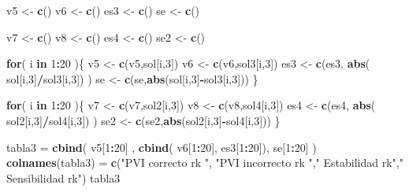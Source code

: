 \documentclass[]{article}
\newenvironment{Shaded}{\begin{snugshade}}{\end{snugshade}}
\newcommand{\KeywordTok}[1]{\textcolor[rgb]{0.13,0.29,0.53}{\textbf{#1}}}
\newcommand{\DecValTok}[1]{\textcolor[rgb]{0.00,0.00,0.81}{#1}}
\newcommand{\StringTok}[1]{\textcolor[rgb]{0.31,0.60,0.02}{#1}}
\newcommand{\ControlFlowTok}[1]{\textcolor[rgb]{0.13,0.29,0.53}{\textbf{#1}}}
\newcommand{\OperatorTok}[1]{\textcolor[rgb]{0.81,0.36,0.00}{\textbf{#1}}}
\newcommand{\NormalTok}[1]{#1}
\begin{document}
\begin{Shaded}
\begin{Highlighting}[]
\NormalTok{v5 <-}\StringTok{ }\KeywordTok{c}\NormalTok{()}
\NormalTok{v6 <-}\StringTok{ }\KeywordTok{c}\NormalTok{()}
\NormalTok{es3 <-}\StringTok{ }\KeywordTok{c}\NormalTok{()}
\NormalTok{se <-}\StringTok{ }\KeywordTok{c}\NormalTok{()}

\NormalTok{v7 <-}\StringTok{ }\KeywordTok{c}\NormalTok{()}
\NormalTok{v8 <-}\StringTok{ }\KeywordTok{c}\NormalTok{()}
\NormalTok{es4 <-}\StringTok{ }\KeywordTok{c}\NormalTok{()}
\NormalTok{se2 <-}\StringTok{ }\KeywordTok{c}\NormalTok{()}

\ControlFlowTok{for}\NormalTok{( i }\ControlFlowTok{in} \DecValTok{1}\OperatorTok{:}\DecValTok{20}\NormalTok{ )\{}
\NormalTok{  v5 <-}\StringTok{ }\KeywordTok{c}\NormalTok{(v5,sol[i,}\DecValTok{3}\NormalTok{])}
\NormalTok{  v6 <-}\StringTok{ }\KeywordTok{c}\NormalTok{(v6,sol3[i,}\DecValTok{3}\NormalTok{])}
\NormalTok{  es3 <-}\StringTok{ }\KeywordTok{c}\NormalTok{(es3, }\KeywordTok{abs}\NormalTok{( sol[i,}\DecValTok{3}\NormalTok{]}\OperatorTok{/}\NormalTok{sol3[i,}\DecValTok{3}\NormalTok{]) ) }
\NormalTok{  se <-}\StringTok{ }\KeywordTok{c}\NormalTok{(se,}\KeywordTok{abs}\NormalTok{(sol[i,}\DecValTok{3}\NormalTok{]}\OperatorTok{-}\NormalTok{sol3[i,}\DecValTok{3}\NormalTok{]))}
\NormalTok{\}}

\ControlFlowTok{for}\NormalTok{( i }\ControlFlowTok{in} \DecValTok{1}\OperatorTok{:}\DecValTok{20}\NormalTok{ )\{}
\NormalTok{  v7 <-}\StringTok{ }\KeywordTok{c}\NormalTok{(v7,sol2[i,}\DecValTok{3}\NormalTok{])}
\NormalTok{  v8 <-}\StringTok{ }\KeywordTok{c}\NormalTok{(v8,sol4[i,}\DecValTok{3}\NormalTok{])}
\NormalTok{  es4 <-}\StringTok{ }\KeywordTok{c}\NormalTok{(es4, }\KeywordTok{abs}\NormalTok{( sol2[i,}\DecValTok{3}\NormalTok{]}\OperatorTok{/}\NormalTok{sol4[i,}\DecValTok{3}\NormalTok{]) ) }
\NormalTok{  se2 <-}\StringTok{ }\KeywordTok{c}\NormalTok{(se2,}\KeywordTok{abs}\NormalTok{(sol2[i,}\DecValTok{3}\NormalTok{]}\OperatorTok{-}\NormalTok{sol4[i,}\DecValTok{3}\NormalTok{]))}
\NormalTok{\}}

\NormalTok{tabla3 =}\StringTok{ }\KeywordTok{cbind}\NormalTok{( v5[}\DecValTok{1}\OperatorTok{:}\DecValTok{20}\NormalTok{] , }\KeywordTok{cbind}\NormalTok{( v6[}\DecValTok{1}\OperatorTok{:}\DecValTok{20}\NormalTok{], es3[}\DecValTok{1}\OperatorTok{:}\DecValTok{20}\NormalTok{]), se[}\DecValTok{1}\OperatorTok{:}\DecValTok{20}\NormalTok{] )}
\KeywordTok{colnames}\NormalTok{(tabla3) =}\StringTok{ }\KeywordTok{c}\NormalTok{(}\StringTok{"PVI correcto rk "}\NormalTok{, }\StringTok{"PVI incorrecto rk "}\NormalTok{,}\StringTok{"  Estabilidad rk"}\NormalTok{,}\StringTok{"  Sensibilidad rk"}\NormalTok{)}
\NormalTok{tabla3}
\end{Highlighting}
\end{Shaded}
\end{document}
